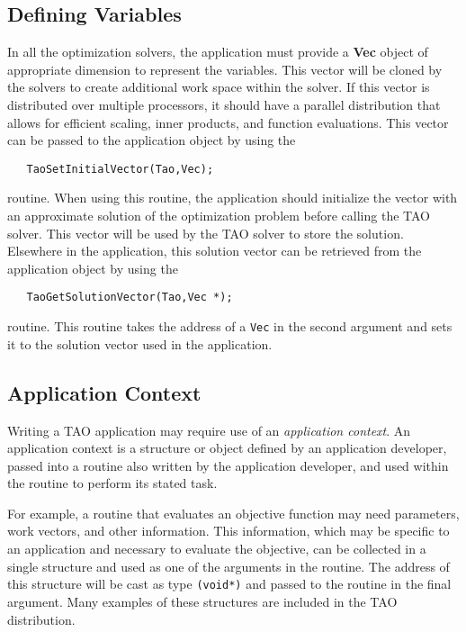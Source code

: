 \subsection{Defining Variables}
In all the optimization solvers, the application must provide
a {\bf Vec} object of appropriate dimension to represent the variables.
This vector will be cloned by the solvers to create additional work
space within the solver.
If this vector is distributed over multiple processors, it
should have a parallel distribution that allows
for efficient scaling, inner products, and
function evaluations.  This vector can be passed to the
application object by using the  
\begin{verbatim}
   TaoSetInitialVector(Tao,Vec);
\end{verbatim}
routine. 
When using this routine, the application should initialize the vector with
an approximate solution of the optimization problem before calling the
TAO solver.
This vector will be used by the TAO solver to store the solution.
Elsewhere in the application, 
this solution vector can be retrieved from the application object 
by using the  
\begin{verbatim}
   TaoGetSolutionVector(Tao,Vec *);
\end{verbatim}
routine. 
This routine takes the address of a {\tt Vec} in the second argument and sets it to
the solution vector used in the application.

\subsection{Application Context}  
Writing a TAO application may require
use of an {\em application context}.
An application context is a structure or object defined by an
application developer, passed
into a routine also written by the application developer, 
and used within the routine to perform its stated task.
 
For example, a routine that evaluates an objective function may need
parameters, work vectors, and other information.   This information,
which may be specific to an application and necessary to evaluate the objective,
can be collected in a single structure and used as one of the
arguments in the routine.
The address of this structure will be cast as type {\tt (void*)} and passed to
the routine in the final argument.
Many examples of these structures are included in the
TAO distribution.

